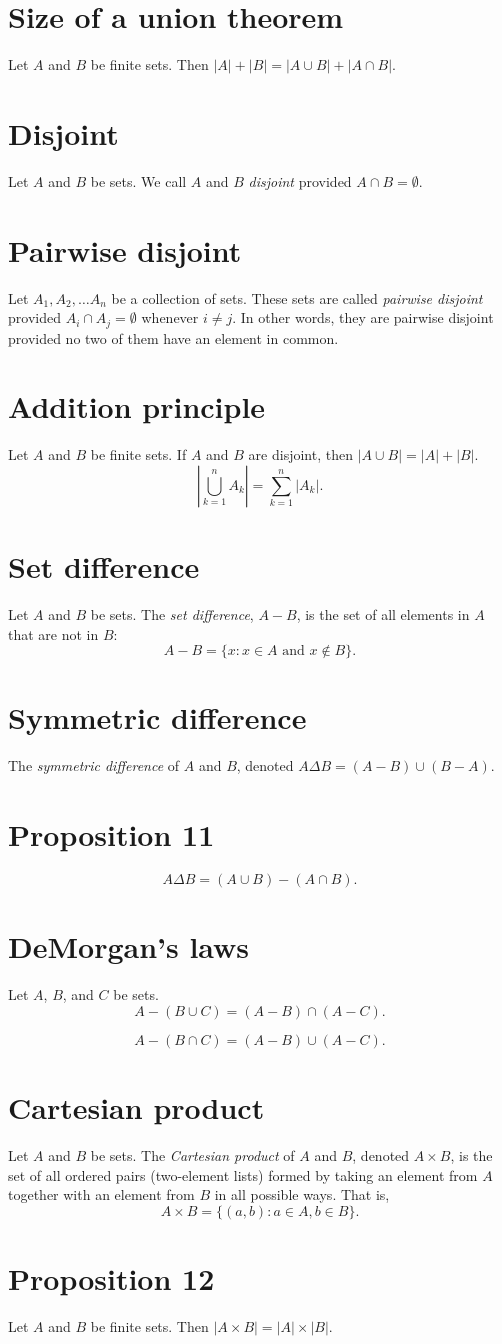 \documentclass[12pt]{article}
\begin{document}
\section*{Size of a union theorem}
Let $A$ and $B$ be finite sets. Then $|A|+|B|=|A\cup B|+|A\cap B|$.
\section*{Disjoint}
Let $A$ and $B$ be sets. We call $A$ and $B$ \textit{disjoint} provided $A\cap B=\emptyset$.
\section*{Pairwise disjoint}
Let $A_1,A_2,\dots A_n$ be a collection of sets. These sets are called \textit{pairwise disjoint} provided $A_i\cap A_j=\emptyset$ whenever $i\neq j$. In other words, they are pairwise disjoint provided no two of them have an element in common.
\section*{Addition principle}
Let $A$ and $B$ be finite sets. If $A$ and $B$ are disjoint, then $|A\cup B|=|A|+|B|$.
\[\left|\bigcup_{k=1}^n{A_k}\right|=\sum_{k=1}^n{|A_k|}.\]
\section*{Set difference}
Let $A$ and $B$ be sets. The \textit{set difference}, $A-B$, is the set of all elements in $A$ that are not in $B$:
\[A-B=\{x:x\in A\text{ and }x \notin B\}.\]
\section*{Symmetric difference}
The \textit{symmetric difference} of $A$ and $B$, denoted $A\Delta B=(A-B)\cup(B-A)$.
\section*{Proposition 11}
\[A\Delta B=(A\cup B)-(A\cap B).\]
\section{DeMorgan's laws}
Let $A$, $B$, and $C$ be sets.
\[A-(B\cup C)=(A-B)\cap(A-C).\]

\[A-(B\cap C)=(A-B)\cup(A-C).\]
\section*{Cartesian product}
Let $A$ and $B$ be sets. The \textit{Cartesian product} of $A$ and $B$, denoted $A\times B$, is the set of all ordered pairs (two-element lists) formed by taking an element from $A$ together with an element from $B$ in all possible ways. That is,
\[A\times B=\{(a,b):a\in A,b\in B\}.\]
\section*{Proposition 12}
Let $A$ and $B$ be finite sets. Then $|A\times B|=|A|\times|B|$.
\end{document}
